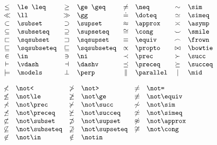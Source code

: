 \documentclass{article}
\begin{document}
    \begin{math}
        \begin{array}{clclclcl}
            \le & \verb=\le \leq= & \ge & \verb=\ge \geq= & \neq & \verb=\neq= & \sim & \verb=\sim= \\
            \ll & \verb=\ll= & \gg & \verb=\gg= & \doteq & \verb=\doteq= & \simeq & \verb=\simeq= \\
            \subset & \verb=\subset= & \supset & \verb=\supset= & \approx & \verb=\approx= & \asymp & \verb=\asymp= \\
            \subseteq & \verb=\subseteq= & \supseteq & \verb=\supseteq= & \cong & \verb=\cong=  & \smile & \verb=\smile= \\
            \sqsubset & \verb=\sqsubset= & \sqsupset & \verb=\sqsupset= & \equiv & \verb=\equiv=  & \frown & \verb=\frown= \\
            \sqsubseteq & \verb=\sqsubseteq= & \sqsubseteq & \verb=\sqsubseteq= & \propto & \verb=\propto=  & \bowtie & \verb=\bowtie= \\
            \in & \verb=\in= & \ni & \verb=\ni= & \prec & \verb=\prec=  & \succ & \verb=\succ= \\
            \vdash & \verb=\vdash= & \dashv & \verb=\dashv= & \preceq & \verb=\preceq=  & \succeq & \verb=\succeq= \\
            \models & \verb=\models= & \perp & \verb=\perp= & \parallel & \verb=\parallel=  & \mid & \verb=\mid= \\
        \end{array}
    \end{math}


    \begin{math}
        \begin{array}{clclcl}
            \not< & \verb=\not<= & \not> & \verb=\not>= & \not= & \verb|\not=| \\
            \not\le & \verb=\not\le= & \not\ge & \verb=\not\ge= & \not\equiv & \verb=\not\equiv= \\
            \not\prec & \verb=\not\prec= & \not\succ & \verb=\not\succ= & \not\sim & \verb=\not\sim= \\
            \not\preceq & \verb=\not\preceq= & \not\succeq & \verb=\not\succeq= & \not\simeq & \verb=\not\simeq= \\
            \not\subset & \verb=\not\subset= & \not\supset & \verb=\not\supset= & \not\approx & \verb=\not\approx= \\
            \not\subseteq & \verb=\not\subseteq= & \not\supseteq & \verb=\not\supseteq= & \not\cong & \verb=\not\cong= \\
            \not\in & \verb=\not\in= & \notin & \verb=\notin= \\
        \end{array}
    \end{math}
\end{document}
